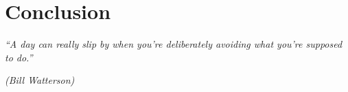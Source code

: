 \documentclass[tcc]{subfiles}
\begin{document}
\chapter{Conclusion}
\label{ch:conclusion}
        \epigraph{\em ``A day can really slip by when you're deliberately avoiding what you're
        supposed to do.''}
        {\em (Bill Watterson)}
\end{document}
